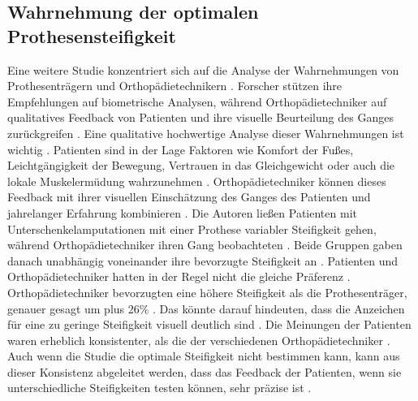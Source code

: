 \subsection{Wahrnehmung der optimalen Prothesensteifigkeit} %
Eine weitere Studie konzentriert sich auf die Analyse der Wahrnehmungen von Prothesenträgern und Orthopädietechnikern \cite{Shepherd.2020}. Forscher stützen ihre Empfehlungen auf biometrische Analysen, während Orthopädietechniker auf qualitatives Feedback von Patienten und ihre visuelle Beurteilung des Ganges zurückgreifen \cite{Shepherd.2020}. Eine qualitative hochwertige Analyse dieser Wahrnehmungen ist wichtig \cite{Shepherd.2020}. Patienten sind in der Lage Faktoren wie Komfort der Fußes, Leichtgängigkeit der Bewegung, Vertrauen in das Gleichgewicht oder auch die lokale Muskelermüdung wahrzunehmen \cite{Shepherd.2020}. Orthopädietechniker können dieses Feedback mit ihrer visuellen Einschätzung des Ganges des Patienten und jahrelanger Erfahrung kombinieren \cite{Shepherd.2020}. Die Autoren ließen Patienten mit Unterschenkelamputationen mit einer Prothese variabler Steifigkeit gehen, während Orthopädietechniker ihren Gang beobachteten \cite{Shepherd.2020}. Beide Gruppen gaben danach unabhängig voneinander ihre bevorzugte Steifigkeit an \cite{Shepherd.2020}. 
Patienten und Orthopädietechniker hatten in der Regel nicht die gleiche Präferenz \cite{Shepherd.2020}.  Orthopädietechniker bevorzugten eine höhere Steifigkeit als die Prothesenträger, genauer gesagt um plus 26\% \cite{Shepherd.2020}. Das könnte darauf hindeuten, dass die Anzeichen für eine zu geringe Steifigkeit visuell deutlich sind \cite{Shepherd.2020}. 
Die Meinungen der Patienten waren erheblich konsistenter, als die der verschiedenen Orthopädietechniker \cite{Shepherd.2020}. Auch wenn die Studie die optimale Steifigkeit nicht bestimmen kann, kann aus dieser Konsistenz abgeleitet werden, dass das Feedback der Patienten, wenn sie unterschiedliche Steifigkeiten testen können, sehr präzise ist \cite{Shepherd.2020}.

